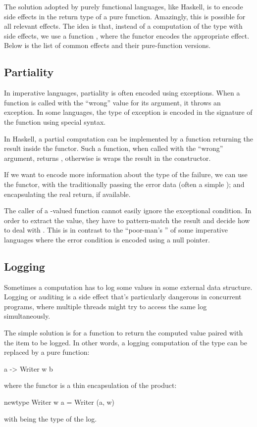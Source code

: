 \documentclass[DaoFP]{subfiles}
\begin{document}
The solution adopted by purely functional languages, like Haskell, is to encode side effects in the return type of a pure function. Amazingly, this is possible for all relevant effects. The idea is that, instead of a computation of the type  with side effects, we use a function , where the functor  encodes the appropriate effect. Below is the list of common effects and their pure-function versions.

\subsection{Partiality}
In imperative languages, partiality is often encoded using exceptions. When a function is called with the ``wrong'' value for its argument, it throws an exception. In some languages, the type of exception is encoded in the signature of the function using special syntax. 

In Haskell, a partial computation can be implemented by a function returning the result inside the  functor. Such a function, when called with the ``wrong'' argument, returns , otherwise is wraps the result in the  constructor.

If we want to encode more information about the type of the failure, we can use the  functor, with the  traditionally passing the error data (often a simple ); and  encapsulating the real return, if available.

The caller of a -valued function cannot easily ignore the exceptional condition. In order to extract the value, they have to pattern-match the result and decide how to deal with . This is in contrast to the ``poor-man's '' of some imperative languages where the error condition is encoded using a null pointer.

\subsection{Logging}

Sometimes a computation has to log some values in some external data structure. Logging or auditing is a side effect that's particularly dangerous in concurrent programs, where multiple threads might try to access the same log simultaneously.

The simple solution is for a function to return the computed value paired with the item to be logged. In other words, a logging computation of the type  can be replaced by a pure function:
\begin{haskell}
a -> Writer w b
\end{haskell}
where the  functor is a thin encapsulation of the product:
\begin{haskell}
newtype Writer w a = Writer (a, w)
\end{haskell}
with  being the type of the log.
\end{document}
